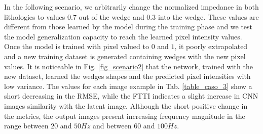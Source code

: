 \documentclass[conference,compsoc]{IEEEtran}
\begin{document}
In the following scenario, we arbitrarily change the normalized impedance in both
lithologies to values $ 0.7 $ out of the wedge and $ 0.3$ into the wedge.
These values are different from those learned by the model during the
training phase and we test the model generalization capacity to reach
the learned pixel intensity values. Once the model is trained with pixel valued to
$ 0 $ and $ 1 $, it poorly extrapolated and a new training dataset is generated
containing wedges with the new pixel values. It is noticeable in
Fig. \ref{fig_scenario2} that the network, trained with the new dataset, learned
the wedges shapes and the predicted pixel intensities with low variance. The values
for each image example in Tab. \ref{table_caso_3} show a short decreasing in the RMSE,
while the FTTI indicates a slight increase in CNN images similarity with the latent image.
Although the short positive change in the metrics, the output images present increasing
frequency magnitude in the range between $ 20 $ and $ 50 Hz $ and between $ 60 $ and $ 100 Hz $.
\end{document}
